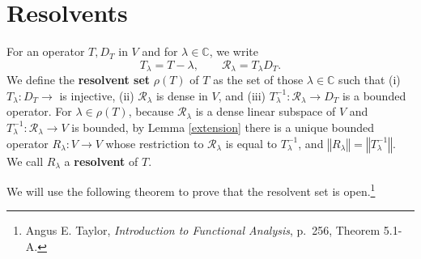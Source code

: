\documentclass{article}
\newcommand{\norm}[1]{\left\Vert #1 \right\Vert}
\theoremstyle{definition}
\begin{document}
\section{Resolvents}
For an operator $T,D_T$ in $V$ and for $\lambda \in \mathbb{C}$, we  write
\[
T_\lambda = T-\lambda,\qquad \mathscr{R}_\lambda = T_\lambda D_T.
\]
We define the \textbf{resolvent set} $\rho(T)$ of $T$ as the set of those $\lambda \in \mathbb{C}$
such that (i) $T_\lambda:D_T \to $ is injective,
(ii) $\mathscr{R}_\lambda$ is dense in $V$, and (iii) $T_\lambda^{-1}:\mathscr{R}_\lambda \to D_T$ is a bounded operator.
For $\lambda \in \rho(T)$, because $ \mathscr{R}_\lambda$ is a dense linear subspace of $V$ and
$T_\lambda^{-1}: \mathscr{R}_\lambda \to V$ is bounded, by Lemma \ref{extension}
there is a unique bounded operator $R_\lambda:V \to V$ whose restriction to
$ \mathscr{R}_\lambda$ is equal to $T_\lambda^{-1}$, and $\norm{R_\lambda}  = \norm{T_\lambda^{-1}}$. 
We call $R_\lambda$ a \textbf{resolvent} of $T$.


We will use the following theorem to prove that the resolvent set is open.\footnote{Angus E. Taylor, {\em Introduction to Functional Analysis}, p.~256, Theorem 5.1-A.}
\end{document}
